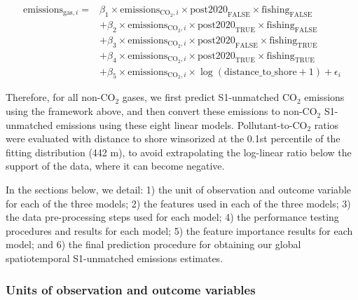 \documentclass[lineno,pdflatex,sn-nature]{sn-jnl}
\begin{document}
\begin{align*}
\text{emissions}_{\text{gas},i} = {} 
  & \beta_1 \times \text{emissions}_{\text{CO}_2,i} \times \text{post2020}_{\text{FALSE}} \times \text{fishing}_{\text{FALSE}} \\
  & + \beta_2 \times \text{emissions}_{\text{CO}_2,i} \times \text{post2020}_{\text{TRUE}} \times \text{fishing}_{\text{FALSE}} \\
  & + \beta_3 \times \text{emissions}_{\text{CO}_2,i} \times \text{post2020}_{\text{FALSE}} \times \text{fishing}_{\text{TRUE}} \\
  & + \beta_4 \times \text{emissions}_{\text{CO}_2,i} \times \text{post2020}_{\text{TRUE}} \times \text{fishing}_{\text{TRUE}} \\
  & + \beta_5 \times \text{emissions}_{\text{CO}_2,i} \times \log(\text{distance\_to\_shore} + 1) + \epsilon_i
\end{align*}

Therefore, for all non-CO$_2$ gases, we first predict S1-unmatched CO$_2$ emissions using the framework above, and then convert these emissions to non-CO$_2$ S1-unmatched emissions using these eight linear models. Pollutant-to-CO$_2$ ratios were evaluated with distance to shore winsorized at the 0.1st percentile of the fitting distribution (442 m), to avoid extrapolating the log-linear ratio below the support of the data, where it can become negative.

In the sections below, we detail: 1) the unit of observation and outcome variable for each of the three models; 2) the features used in each of the three models; 3) the data pre-processing steps used for each model; 4) the performance testing procedures and results for each model; 5) the feature importance results for each model; and 6) the final prediction procedure for obtaining our global spatiotemporal S1-unmatched emissions estimates.

\subsubsection{Units of observation and outcome variables}
\end{document}
